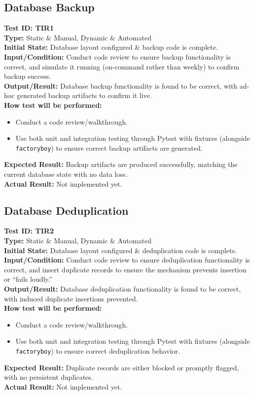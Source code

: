 \documentclass[12pt, titlepage]{article}
\begin{document}
\subsection{Database Backup}

\textbf{Test ID: TIR1}\\
\textbf{Type:} Static \& Manual, Dynamic \& Automated\\
\textbf{Initial State:} Database layout configured \& backup code is complete.\\
\textbf{Input/Condition:} Conduct code review to ensure backup functionality is correct, and simulate it running (on-command rather than weekly) to confirm backup success.\\
\textbf{Output/Result:} Database backup functionality is found to be correct, with ad-hoc generated backup artifacts to confirm it live.\\
\textbf{How test will be performed:}
\begin{itemize}
  \item Conduct a code review/walkthrough.
  \item Use both unit and integration testing through Pytest with fixtures (alongside \texttt{factoryboy}) to ensure correct backup artifacts are generated.
\end{itemize}
\textbf{Expected Result:} Backup artifacts are produced successfully, matching the current database state with no data loss.\\
\textbf{Actual Result:} Not implemented yet.

\subsection{Database Deduplication}

\textbf{Test ID: TIR2}\\
\textbf{Type:} Static \& Manual, Dynamic \& Automated\\
\textbf{Initial State:} Database layout configured \& deduplication code is complete.\\
\textbf{Input/Condition:} Conduct code review to ensure deduplication functionality is correct, and insert duplicate records to ensure the mechanism prevents insertion or “fails loudly.”\\
\textbf{Output/Result:} Database deduplication functionality is found to be correct, with induced duplicate insertions prevented.\\
\textbf{How test will be performed:}
\begin{itemize}
  \item Conduct a code review/walkthrough.
  \item Use both unit and integration testing through Pytest with fixtures (alongside \texttt{factoryboy}) to ensure correct deduplication behavior.
\end{itemize}
\textbf{Expected Result:} Duplicate records are either blocked or promptly flagged, with no persistent duplicates.\\
\textbf{Actual Result:} Not implemented yet.
\end{document}
